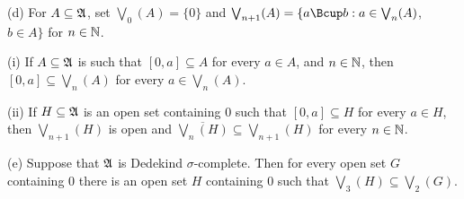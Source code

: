 (d) For $A\subseteq\frak A$, set $\bigvee_0(A)=\{0\}$ and
$\bigvee_{n+1}(A)=\{a\Bcup b:a\in\bigvee_n(A)$, $b\in A\}$ for
$n\in\Bbb N$.

\quad(i) If $A\subseteq\frak A$ is such that $[0,a]\subseteq A$ for every
$a\in A$, and $n\in\Bbb N$, then $[0,a]\subseteq\bigvee_n(A)$ for every
$a\in\bigvee_n(A)$.

\quad(ii) If $H\subseteq\frak A$ is an open set containing $0$ such that
$[0,a]\subseteq H$ for every $a\in H$, then $\bigvee_{n+1}(H)$ is open
and $\overline{\bigvee_n(H)}\subseteq\bigvee_{n+1}(H)$ for every
$n\in\Bbb N$.

(e) Suppose that $\frak A$ is Dedekind $\sigma$-complete.
Then for every open set $G$ containing $0$ there is an open set $H$
containing $0$ such that $\bigvee_3(H)\subseteq\bigvee_2(G)$.

